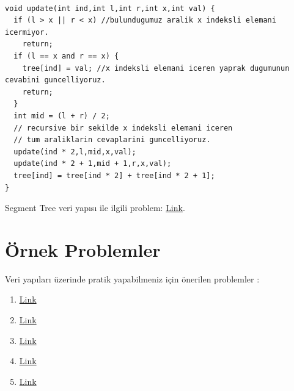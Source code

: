 \documentclass[12pt]{article}
\begin{document}
    \begin{verbatim}

void update(int ind,int l,int r,int x,int val) {
  if (l > x || r < x) //bulundugumuz aralik x indeksli elemani icermiyor.
    return;
  if (l == x and r == x) {
    tree[ind] = val; //x indeksli elemani iceren yaprak dugumunun cevabini guncelliyoruz.
    return;
  }
  int mid = (l + r) / 2;
  // recursive bir sekilde x indeksli elemani iceren
  // tum araliklarin cevaplarini guncelliyoruz.
  update(ind * 2,l,mid,x,val);
  update(ind * 2 + 1,mid + 1,r,x,val);
  tree[ind] = tree[ind * 2] + tree[ind * 2 + 1];
}

    \end{verbatim}
    Segment Tree veri yap{\i}s{\i} ile ilgili problem: \href{https://codeforces.com/gym/100739/problem/A}{Link}.
    \cleardoublepage
    
    \section{\"{O}rnek Problemler}
    
    Veri yap{\i}lar{\i} \"{u}zerinde pratik yapabilmeniz i\c{c}in \"{o}nerilen problemler :
    \begin{enumerate}
        \item \href{https://codeforces.com/problemset/problem/797/C}{Link}
        \item \href{https://codeforces.com/contest/276/problem/C}{Link}
        \item \href{https://codeforces.com/contest/380/problem/C}{Link}
        \item \href{https://www.hackerearth.com/problem/algorithm/benny-and-sum-2/}{Link}
        \item \href{https://www.hackerearth.com/practice/data-structures/advanced-data-structures/fenwick-binary-indexed-trees/practice-problems/algorithm/counting-in-byteland/}{Link}
    \end{enumerate}
    
    \newpage
    
\end{document}
